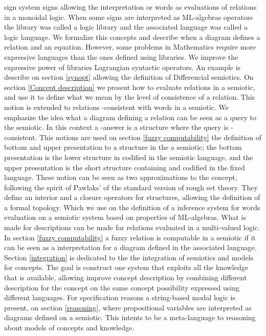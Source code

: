 \documentclass[oribibl]{llncs}
\begin{document}
sign system signs allowing the interpretation or words as evaluations of relations in a monoidal logic.  When some signs
are interpreted as ML-algebras operators the library was called a logic
library and the associated language was called a logic language. We formalize this concepts and describe when a diagram
defines a relation and an equation. However, some problems in Mathematics require more expressive languages than the ones defined using libraries. We improve the expressive power of libraries Lagrangian syntactic operators. An example is describe on section \ref{synopt}  allowing the definition of Differencial semiotics.  On section \ref{Concept description} we present how to
evaluate relations in a semiotic, and use it to define what we mean by
the level of consistence of a relation. This notion is extended to
relations -consistent with words in a semiotic. We emphasize the idea what a diagram defining a relation can be seen as a query to the semiotic. In this context a
-answer is a structure where the query is
-consistent. This notions are used on section \ref{fuzzy computability} the definition of
bottom and upper presentation to a structure  in the a semiotic;
the bottom presentation is the lower structure in  codified in
the semiotic language, and the upper presentation is the short
structure containing  and codified in the fixed language. These
notion can be seen as two approximations to the concept, following the spirit of Pawlaks' of the standard version of rough set theory. They
define an interior and a closure operators for structures, allowing
the definition of a formal topology.  Which we use on the definition of a inference system for words evaluation on a semiotic system based on
properties of ML-algebras. What is made for descriptions can be made for relations evaluated in a multi-valued logic. In section \ref{fuzzy computability} a fuzzy relation is computable in a semiotic if it can be seen as a interpretation for a diagram defined in the associated language.  Section \ref{integration} is dedicated to the the integration of semiotics and models for concepts. The goal is construct one system that exploits all the knowledge that is available, allowing improve concept description by combining different description for the concept on the same concept possibility expressed using different languages. For specification reasons a string-based modal logic is present, on section \ref{reasoning}, where propositional variables are  interpreted as diagrams defined on a semiotic. This intents to be a meta-language to reasoning about models of concepts and knowledge.
\end{document}
